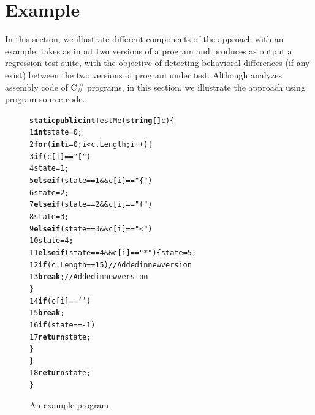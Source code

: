 \section{Example}
\label{sec:example}
In this section, we illustrate different components of the  approach with an example.  takes as input two versions of a program and produces as output a regression test suite, with the objective of detecting behavioral differences (if any exist) between the two versions of program under test. Although  analyzes assembly code of C\# programs, in this section, we illustrate the  approach using program source code. 

\begin{figure}[t]
\begin{CodeOut}
\begin{alltt}

  \hspace{0.25cm}\textbf{static public int} TestMe(\textbf{string[] }c)\{
1 \hspace{0.5cm} \textbf{int} state = 0;
2 \hspace{0.75cm} \textbf{for}(\textbf{int} i=0; i< c.Length; i++)\{
3 \hspace{1.0cm} \textbf{if}(c[i] == "[")
4 \hspace{1.25cm} state =1;
5 \hspace{1.0cm} \textbf{else if}(state == 1 && c[i] == "\{")
6 \hspace{1.25cm} state =2;
7 \hspace{1.0cm} \textbf{else if}(state == 2 && c[i] == "(")
8 \hspace{1.25cm} state =3;
9 \hspace{1.0cm} \textbf{else if}(state == 3 &&  c[i] == "<") 
10\hspace{1.25cm} state =4;
11\hspace{1.0cm} \textbf{else if}(state == 4 && c[i] == "*")\{ state =5;
12\hspace{1.25cm} \textbf{if}(c.Length==15) //Added in new version
13\hspace{1.5cm} \textbf{break}; //Added in new version
	\hspace{1.0cm}   \}
14\hspace{1.0cm} \textbf{if}(c[i]==' ')
15\hspace{1.25cm} \textbf{break};
16\hspace{1.0cm} \textbf{if}(state==-1)
17\hspace{1.25cm} \textbf{return} state;
  \hspace{.75cm} \}
  \hspace{.50cm} \}
18\hspace{.50cm} \textbf{return} state;
  \hspace{0.25cm}\}
  
\end{alltt}
\end{CodeOut}
\vspace{-0.5 cm}
\caption{An example program}
\vspace{-0.4 cm}
\label{fig:example}
\end{figure}

